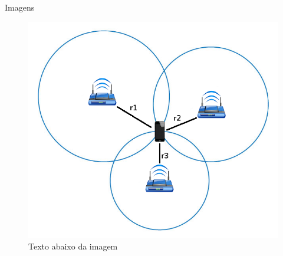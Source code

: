 \begin{frame}{Imagens}
    \begin{figure}
        \centering
        \includegraphics[height=0.65\textheight]{img/trilateration}
        \caption{Texto abaixo da imagem}
        \label{fig:trilateration}
    \end{figure}
\end{frame}